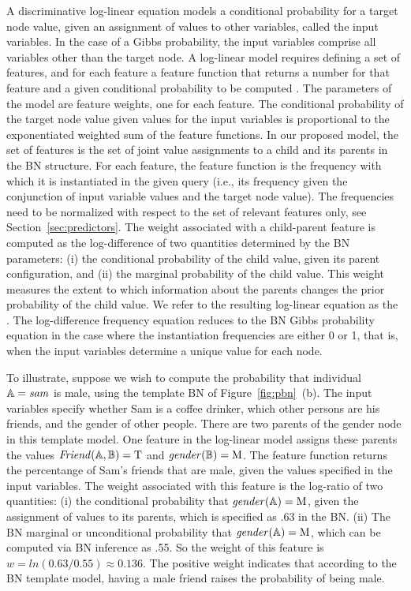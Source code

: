 \documentclass[twoside,11pt]{article}
\begin{document}
A discriminative log-linear equation models a conditional probability for a target node value, given an assignment of values to other variables, called the input variables. In the case of a Gibbs probability, the input variables comprise all variables other than the target node. A log-linear model requires defining a set of features, and for each feature a feature function that returns a number for that feature and a given conditional probability to be computed \cite{Sutton2007}. The parameters of the model are feature weights, one for each feature. The conditional probability of the target node value given values for the input variables is proportional to the exponentiated weighted sum of the feature functions. In our proposed model, the set of features is the set of joint value assignments to a child and its parents in the BN structure. For each feature, the feature function is the frequency with which it is instantiated in the given query (i.e., its frequency given the conjunction of input variable values and the target node value). The frequencies need to be normalized with respect to the set of relevant features only, see Section~\ref{sec:predictors}.  The weight associated with a child-parent feature is computed as the log-difference of two quantities determined by the BN parameters: (i) the conditional probability of the child value, given its parent configuration, and (ii) the marginal probability of the child value. This weight measures the extent to which information about the parents changes the prior probability of the child value. We refer to the resulting log-linear equation as the . The log-difference frequency equation reduces to the BN Gibbs probability equation in the case where the instantiation frequencies are either 0 or 1, that is, when the input variables determine a unique value for each node. 




To illustrate, suppose we wish to compute the probability that individual $\mathbb{A} = \it{sam}$ is male, using the template BN of Figure~\ref{fig:pbn}~(b). The input variables specify whether Sam is a coffee drinker, which other persons are his friends, and the gender of other people. There are two parents of the gender node in this template model. One feature in the log-linear model assigns these parents the values $\it{Friend}(\mathbb{A},\mathbb{B}) = \mathrm{T}$ and $\it{gender}(\mathbb{B}) = \mathrm{M}$. The feature function returns the percentange of Sam's friends that are male, given the values specified in the input variables. The weight associated with this feature is the log-ratio of two quantities: (i) the conditional probability that $\it{gender}(\mathbb{A}) = \mathrm{M}$, given the assignment of values to its parents, which is specified as .63 in the BN. (ii) The BN marginal or unconditional probability that $\it{gender}(\mathbb{A}) = \mathrm{M}$, which can be computed via BN inference as .55. So the weight of this feature is $w = ln(0.63/0.55) \approx 0.136$. The positive weight indicates that according to the BN template model, having a male friend raises the probability of being male.
\end{document}
